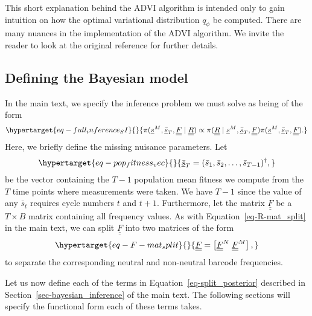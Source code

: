 \documentclass[
  letterpaper,
  DIV=11,
  numbers=noendperiod]{scrartcl}
\begin{document}
\begin{refsegment}
This short explanation behind the ADVI algorithm is intended only to
gain intuition on how the optimal variational distribution \(q_\phi\) be
computed. There are many nuances in the implementation of the ADVI
algorithm. We invite the reader to look at the original reference for
further details.

\hypertarget{sec-bayes_def}{%
\subsection{Defining the Bayesian model}\label{sec-bayes_def}}

In the main text, we specify the inference problem we must solve as
being of the form
\begin{equation}\protect\hypertarget{eq-full_inference_SI}{}{
\pi(
    \underline{s}^M, \underline{\bar{s}}_T, \underline{\underline{F}} \mid
    \underline{\underline{R}}
) \propto
\pi(
    \underline{\underline{R}} \mid
    \underline{s}^M, \underline{\bar{s}}_T, \underline{\underline{F}}
)
\pi(
    \underline{s}^M, \underline{\bar{s}}_T, \underline{\underline{F}}
).
}\label{eq-full_inference_SI}\end{equation} Here, we briefly define the
missing nuisance parameters. Let
\begin{equation}\protect\hypertarget{eq-pop_fitness_vec}{}{
\underline{\bar{s}}_T = (\bar{s}_1, \bar{s}_2, \ldots, \bar{s}_{T-1})^\dagger,
}\label{eq-pop_fitness_vec}\end{equation} be the vector containing the
\(T-1\) population mean fitness we compute from the \(T\) time points
where measurements were taken. We have \(T-1\) since the value of any
\(\bar{s}_t\) requires cycle numbers \(t\) and \(t+1\). Furthermore, let
the matrix \(\underline{\underline{F}}\) be a \(T \times B\) matrix
containing all frequency values. As with Equation~\ref{eq-R-mat_split}
in the main text, we can split \(\underline{\underline{F}}\) into two
matrices of the form
\begin{equation}\protect\hypertarget{eq-F-mat_split}{}{
\underline{\underline{F}} = \left[ 
\underline{\underline{F}}^N \; \underline{\underline{F}}^M
\right],
}\label{eq-F-mat_split}\end{equation} to separate the corresponding
neutral and non-neutral barcode frequencies.

Let us now define each of the terms in Equation~\ref{eq-split_posterior}
described in Section~\ref{sec-bayesian_inference} of the main text. The
following sections will specify the functional form each of these terms
takes.


\end{refsegment}
\end{document}
